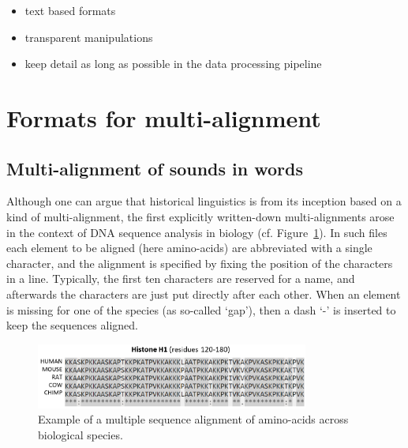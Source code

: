 \documentclass[11pt]{article}
\begin{document}
\begin{itemize}[nolistsep]
\item text based formats
\item transparent manipulations
\item keep detail as long as possible in the data processing pipeline
\end{itemize}

\section{Formats for multi-alignment}

\subsection{Multi-alignment of sounds in words}

Although one can argue that historical linguistics is from its inception based on a kind of multi-alignment, the first explicitly written-down multi-alignments arose in the context of DNA sequence analysis in biology (cf. Figure~\ref{fig:aminoacids}). In such files each element to be aligned (here amino-acids) are abbreviated with a single character, and the alignment is specified by fixing the position of the characters in a line. Typically, the first ten characters are reserved for a name, and afterwards the characters are just put directly after each other. When an element is missing for one of the species (as so-called `gap'), then a dash `-' is inserted to keep the sequences aligned.

\begin{figure}[htbp] 
	\centering
	\includegraphics[width=0.8\textwidth]{images/Histone_Alignment.png}
 	\caption{Example of a multiple sequence alignment of amino-acids across biological species.\protect\footnotemark}
	\label{fig:aminoacids}
\end{figure}
\end{document}
